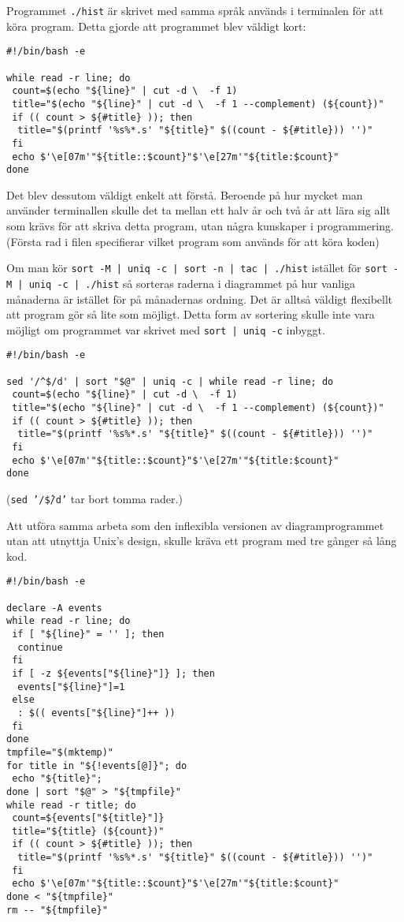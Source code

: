 \documentclass[12pt,a4paper]{article}
\begin{document}
Programmet \texttt{./hist} är skrivet med samma språk
används i terminalen för att köra program. Detta gjorde
att programmet blev väldigt kort:

\begin{verbatim}
#!/bin/bash -e

while read -r line; do
 count=$(echo "${line}" | cut -d \  -f 1)
 title="$(echo "${line}" | cut -d \  -f 1 --complement) (${count})"
 if (( count > ${#title} )); then
  title="$(printf '%s%*.s' "${title}" $((count - ${#title})) '')"
 fi
 echo $'\e[07m'"${title::$count}"$'\e[27m'"${title:$count}"
done
\end{verbatim}

Det blev dessutom väldigt enkelt att förstå. Beroende
på hur mycket man använder terminallen skulle det ta
mellan ett halv år och två år att lära sig allt som krävs
för att skriva detta program, utan några kunskaper i
programmering. (Första rad i filen specifierar vilket
program som används för att köra koden)

Om man kör \texttt{sort -M | uniq -c | sort -n | tac | ./hist}
istället för \texttt{sort -M | uniq -c | ./hist} så sorteras
raderna i diagrammet på hur vanliga månaderna är istället
för på månadernas ordning. Det är alltså väldigt flexibellt
att program gör så lite som möjligt. Detta form av sortering
skulle inte vara möjligt om programmet var skrivet med
\texttt{sort | uniq -c} inbyggt.

\begin{verbatim}
#!/bin/bash -e

sed '/^$/d' | sort "$@" | uniq -c | while read -r line; do
 count=$(echo "${line}" | cut -d \  -f 1)
 title="$(echo "${line}" | cut -d \  -f 1 --complement) (${count})"
 if (( count > ${#title} )); then
  title="$(printf '%s%*.s' "${title}" $((count - ${#title})) '')"
 fi
 echo $'\e[07m'"${title::$count}"$'\e[27m'"${title:$count}"
done
\end{verbatim}

\noindent
(\texttt{sed '/\^\$/d'} tar bort tomma rader.)
\newpage

Att utföra samma arbeta som den inflexibla versionen
av diagramprogrammet utan att utnyttja Unix's design,
skulle kräva ett program med tre gånger så lång kod.

\begin{verbatim}
#!/bin/bash -e

declare -A events
while read -r line; do
 if [ "${line}" = '' ]; then
  continue
 fi
 if [ -z ${events["${line}"]} ]; then
  events["${line}"]=1
 else
  : $(( events["${line}"]++ ))
 fi
done
tmpfile="$(mktemp)"
for title in "${!events[@]}"; do
 echo "${title}";
done | sort "$@" > "${tmpfile}"
while read -r title; do
 count=${events["${title}"]}
 title="${title} (${count})"
 if (( count > ${#title} )); then
  title="$(printf '%s%*.s' "${title}" $((count - ${#title})) '')"
 fi
 echo $'\e[07m'"${title::$count}"$'\e[27m'"${title:$count}"
done < "${tmpfile}"
rm -- "${tmpfile}"
\end{verbatim}
\end{document}
